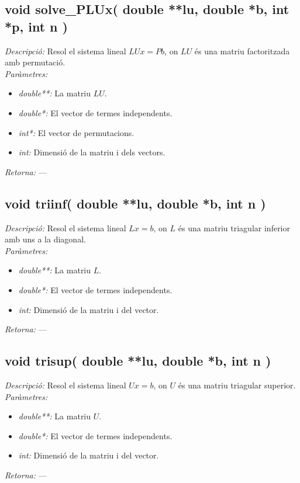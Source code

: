 \documentclass[a4paper,10pt, notitlepage]{article}
\begin{document}
\subsection{void solve\_PLUx( double **lu, double *b, int *p, int n )}
\textit{Descripció: }
  Resol el sistema lineal $LUx = Pb$, on $LU$ és una matriu factoritzada amb permutació.
\\\textit{Paràmetres: }\begin{itemize}[label={--}]
  \item \textit{double**: } La matriu $LU$.
  \item \textit{double*: } El vector de termes independents.
  \item \textit{int*: } El vector de permutacions.
  \item \textit{int: } Dimensió de la matriu i dels vectors.
\end{itemize}
\textit{Retorna: } ---



\subsection{void triinf( double **lu, double *b, int n )}
\textit{Descripció: }
  Resol el sistema lineal $Lx = b$, on $L$ és una matriu triagular inferior amb uns a la diagonal.
\\\textit{Paràmetres: }\begin{itemize}[label={--}]
  \item \textit{double**: } La matriu $L$.
  \item \textit{double*: } El vector de termes independents.
  \item \textit{int: } Dimensió de la matriu i del vector.
\end{itemize}
\textit{Retorna: } ---



\subsection{void trisup( double **lu, double *b, int n )}
\textit{Descripció: }
  Resol el sistema lineal $Ux = b$, on $U$ és una matriu triagular superior.
\\\textit{Paràmetres: }\begin{itemize}[label={--}]
  \item \textit{double**: } La matriu $U$.
  \item \textit{double*: } El vector de termes independents.
  \item \textit{int: } Dimensió de la matriu i del vector.
\end{itemize}
\textit{Retorna: } ---
\end{document}
